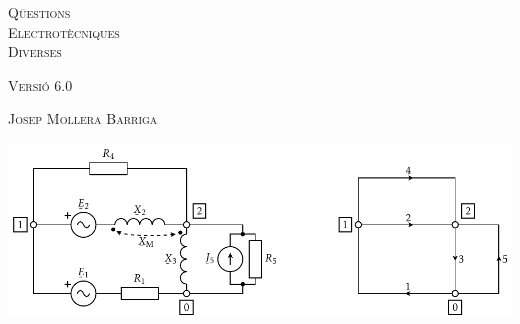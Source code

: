 \begin{titlepage}

   \parbox{18cm}{\fontsize{60pt}{60pt}\selectfont\color{NavyBlue}\scshape%
                 Q\"{u}estions\\[30pt] Electrot\`{e}cniques\\[30pt] Diverses}

   \vspace*{1.8cm}
   {\fontsize{30pt}{30pt}\selectfont\textsc{Versi\'{o} 6.0}}

   \vspace*{2cm}
   {\fontsize{40pt}{40pt}\selectfont\textsc{Josep Mollera Barriga}}

   \vspace*{3cm}
   \includegraphics{Imatges/Cap-ResXarxElec-Circuit-Graf.pdf}

\end{titlepage}

